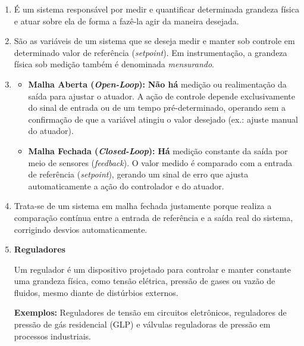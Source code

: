 

\begin{enumerate}[label=\textbf{\arabic*)}, leftmargin=*]

    \item 
    
    É um sistema responsável por medir e quantificar determinada grandeza física e atuar sobre ela de forma a fazê-la agir da maneira desejada.

    \item
    
    São as variáveis de um sistema que se deseja medir e manter sob controle em determinado valor de referência (\textit{setpoint}). Em instrumentação, a grandeza física sob medição também é denominada \textit{mensurando}.

    \item 
    
    \begin{itemize}
        \item \textbf{Malha Aberta (\textit{Open-Loop}):} \textbf{Não há} medição ou realimentação da saída para ajustar o atuador. A ação de controle depende exclusivamente do sinal de entrada ou de um tempo pré-determinado, operando sem a confirmação de que a variável atingiu o valor desejado (ex.: ajuste manual do atuador).
        \item \textbf{Malha Fechada (\textit{Closed-Loop}):} \textbf{Há} medição constante da saída por meio de sensores (\textit{feedback}). O valor medido é comparado com a entrada de referência (\textit{setpoint}), gerando um sinal de erro que ajusta automaticamente a ação do controlador e do atuador.
    \end{itemize}

    \item 
    
    Trata-se de um sistema em malha fechada justamente porque realiza a comparação contínua entre a entrada de referência e a saída real do sistema, corrigindo desvios automaticamente.

    \item \textbf{Reguladores}
    
    Um regulador é um dispositivo projetado para controlar e manter constante uma grandeza física, como tensão elétrica, pressão de gases ou vazão de fluidos, mesmo diante de distúrbios externos.
    
    \textbf{Exemplos:} Reguladores de tensão em circuitos eletrônicos, reguladores de pressão de gás residencial (GLP) e válvulas reguladoras de pressão em processos industriais.


\end{enumerate}
